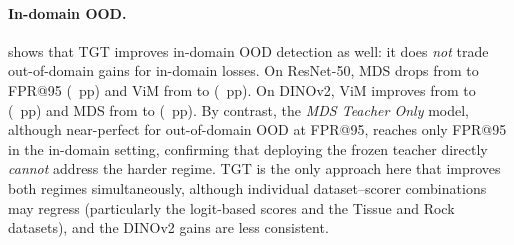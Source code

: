 \paragraph{In-domain OOD.}
 shows that TGT improves in-domain OOD detection as well: it does \emph{not} trade out-of-domain gains for in-domain losses. On ResNet-50, MDS drops from  to  FPR@95 (~pp) and ViM from  to  (~pp). On DINOv2, ViM improves from  to  (~pp) and MDS from  to  (~pp). By contrast, the \emph{MDS Teacher Only} model, although near-perfect for out-of-domain OOD at  FPR@95, reaches only  FPR@95 in the in-domain setting, confirming that deploying the frozen teacher directly \emph{cannot} address the harder regime. TGT is the only approach here that improves both regimes simultaneously, although individual dataset--scorer combinations may regress (particularly the logit-based scores and the Tissue and Rock datasets), and the DINOv2 gains are less consistent.

